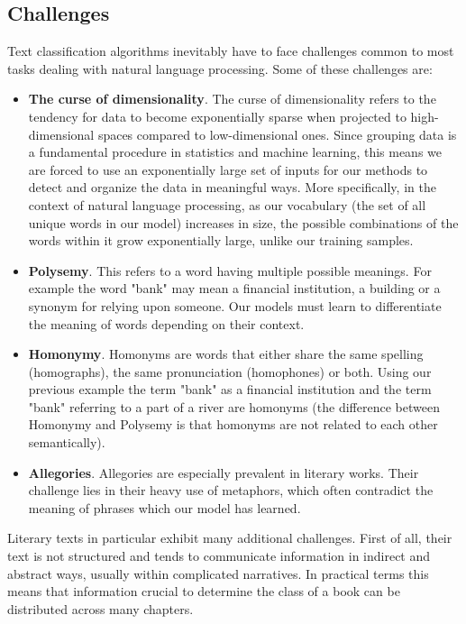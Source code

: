 \documentclass{article}
\begin{document}
	\subsection{Challenges}
	Text classification algorithms inevitably have to face challenges common to most tasks dealing with natural language processing. Some of these challenges are:
	
	\begin{itemize}
		\item \textbf{The curse of dimensionality}. The curse of dimensionality refers to the tendency for data to become exponentially sparse when projected to high-dimensional spaces compared to low-dimensional ones. Since grouping data is a fundamental procedure in statistics and machine learning, this means we are forced to use an exponentially large set of inputs for our methods to detect and organize the data in meaningful ways. More specifically, in the context of natural language processing, as our vocabulary (the set of all unique words in our model) increases in size, the possible combinations of the words within it grow exponentially large, unlike our training samples.
		
		\item \textbf{Polysemy}. This refers to a word having multiple possible meanings. For example the word "bank" may mean a financial institution, a building or a synonym for relying upon someone. Our models must learn to differentiate the meaning of words depending on their context.
		
		\item \textbf{Homonymy}. Homonyms are words that either share the same spelling (homographs), the same pronunciation (homophones) or both. Using our previous example the term "bank" as a financial institution and the term "bank" referring to a part of a river are homonyms (the difference between Homonymy and Polysemy is that homonyms are not related to each other semantically).
		
		\item \textbf{Allegories}. Allegories are especially prevalent in literary works. Their challenge lies in their heavy use of metaphors, which often contradict the meaning of phrases which our model has learned.
	\end{itemize}
	
	
	Literary texts in particular exhibit many additional challenges. First of all, their text is not structured and tends to communicate information in indirect and abstract ways, usually within complicated narratives. In practical terms this means that information crucial to determine the class of a book can be distributed across many chapters\cite{worsham}. \par 
	
\end{document}
